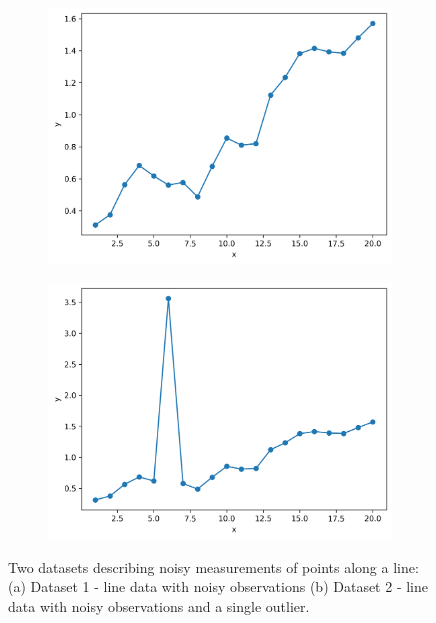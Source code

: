 \documentclass[11pt]{article}
\begin{document}
\begin{figure}[H]
    \centering
    \begin{subfigure}{.45\textwidth}
        \centering
        \includegraphics[width=\linewidth]{figs/q2a_noisy_line.png}
        \caption{}
        \label{fig:line_data_1}
    \end{subfigure}%
    \begin{subfigure}{.45\textwidth}
        \centering
        \includegraphics[width=\linewidth]{figs/q2a_noisy_line_outlier.png}
        \caption{}
        \label{fig:line_data_2}
    \end{subfigure}%
    \caption{Two datasets describing noisy measurements of points along a line: (a) Dataset 1 - line data with noisy observations (b) Dataset 2 - line data with noisy observations and a single outlier.}
    \label{fig:line_fitting_data}
\end{figure}
\end{document}
